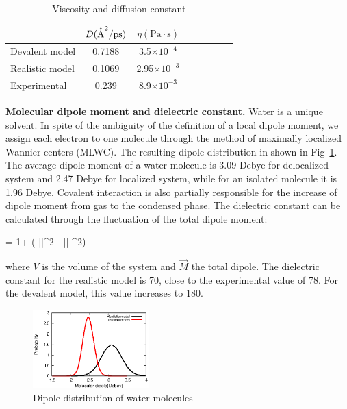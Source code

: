 \documentclass[aps,prl,reprint,amsmath,amssymb]{revtex4-1}
\begin{document}
\begin{table}
\caption{Viscosity and diffusion constant}\label{Tab:dfs}
\begin{tabular}{l*{6}{c}r}
\hline
               & $D(\mathring{\text{A}}^2/\text{ps})$ & $\eta(\text{Pa}\cdot \text{s})$ \\
\hline
Devalent model                & 0.7188 & 3.5$\times 10^{-4}$ \\

Realistic model              & 0.1069 & 2.95$\times 10^{-3}$\\

Experimental            & 0.239  & 8.9$\times 10^{-3} $


\end{tabular}

\end{table}
 

\textbf{Molecular dipole moment and dielectric constant.} Water is a unique solvent. In spite of the ambiguity of the definition of a local dipole moment, we assign each electron to one molecule through the method of maximally localized Wannier centers (MLWC). The resulting dipole distribution in shown in Fig~\ref{Fig:dipoledist}. The average dipole moment of a water molecule is 3.09 Debye for delocalized system and 2.47 Debye for localized system, while for an isolated molecule it is 1.96 Debye. \new Covalent interaction is also partially responsible for the increase of dipole moment from gas to the condensed phase. \old The dielectric constant can be calculated through the fluctuation of the total dipole moment\cite{neumann1983dipole,adams1981theory}:

\bea
\epsilon = 1+  (  \langle ||^2 \rangle  - \langle || \rangle ^2) \label{Eq:dielectric}
\eea

where $V$ is the volume of the system and $\vec{M}$ the total dipole. The dielectric constant for the realistic model is 70, close to the experimental value of 78. For the devalent model, this value increases to 180.

\begin{figure}
\includegraphics[width=0.4\textwidth]{new_dipole}
\caption{Dipole distribution of water molecules} \label{Fig:dipoledist}
\end{figure}
\end{document}
